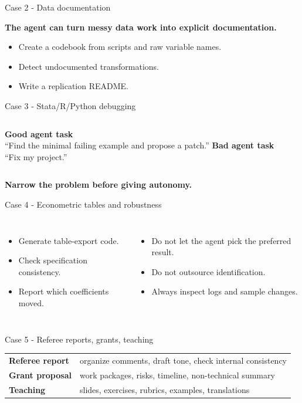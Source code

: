 \documentclass[aspectratio=169,10pt]{beamer}
\newcommand{\bigpoint}[1]{\begin{center}\Huge\bfseries\color{deepblue}#1\end{center}}
\newcommand{\threebullets}[3]{\begin{itemize}\item #1\item #2\item #3\end{itemize}}
\begin{document}
\begin{frame}{Case 2 - Data documentation}
\begin{center}\Large\bfseries\color{deepblue}The agent can turn messy data work into explicit documentation.\end{center}
\vspace{0.5cm}
\threebullets{Create a codebook from scripts and raw variable names.}{Detect undocumented transformations.}{Write a replication README.}
\end{frame}

\begin{frame}{Case 3 - Stata/R/Python debugging}
\begin{columns}[T,onlytextwidth]
\textbf{Good agent task}\\[0.2cm]
``Find the minimal failing example and propose a patch.''
\textbf{Bad agent task}\\[0.2cm]
``Fix my project.''
\end{columns}
\vspace{0.7cm}
\bigpoint{Narrow the problem before giving autonomy.}
\end{frame}

\begin{frame}{Case 4 - Econometric tables and robustness}
\begin{columns}[T,onlytextwidth]
\threebullets{Generate table-export code.}{Check specification consistency.}{Report which coefficients moved.}
\threebullets{Do not let the agent pick the preferred result.}{Do not outsource identification.}{Always inspect logs and sample changes.}
\end{columns}
\end{frame}

\begin{frame}{Case 5 - Referee reports, grants, teaching}
\begin{center}
\begin{tabularx}{0.9\linewidth}{>{\bfseries}lX}
\toprule
Referee report & organize comments, draft tone, check internal consistency \\
Grant proposal & work packages, risks, timeline, non-technical summary \\
Teaching & slides, exercises, rubrics, examples, translations \\
\bottomrule
\end{tabularx}
\end{center}
\end{frame}
\end{document}
